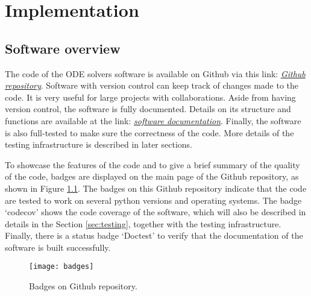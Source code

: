 \chapter{Implementation}
\label{chap:code-implementation}
\section{Software overview}
\label{sec:software-overview}
The code of the ODE solvers software is available on Github via this link: \href{https://github.com/FarmHJ/numerical-solver}{\underline{\emph{Github repository}}}. Software with version control can keep track of changes made to the code. It is very useful for large projects with collaborations. Aside from having version control, the software is fully documented. Details on its structure and functions are available at the link: \href{https://numerical-solver.readthedocs.io/en/latest/index.html}{\underline{\emph{software documentation}}}. Finally, the software is also full-tested to make sure the correctness of the code. More details of the testing infrastructure is described in later sections. 

To showcase the features of the code and to give a brief summary of the quality of the code, badges are displayed on the main page of the Github repository, as shown in Figure \ref{fig:badges}. The badges on this Github repository indicate that the code are tested to work on several python versions and operating systems. The badge `codecov' shows the code coverage of the software, which will also be described in details in the Section \ref{sec:testing}, together with the testing infrastructure. Finally, there is a status badge `Doctest' to verify that the documentation of the software is built successfully.

\begin{figure}
    \texttt{[image: badges]}
    \caption{Badges on Github repository.}
    \label{fig:badges}
\end{figure}

